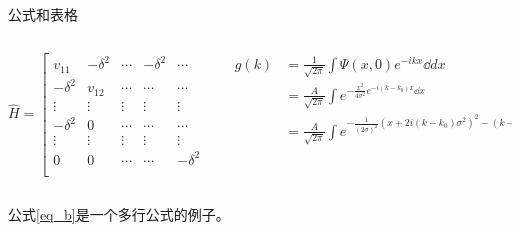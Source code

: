 \documentclass[10pt,aspectratio=169]{beamer}
\begin{document}
\begin{frame}{公式和表格}
    \begin{columns}
        \begin{column}{0.45\textwidth}
        \[ \hat{H} = \left[
        \begin{array}{cccccc}
        v_{11} & -\delta^2  & \cdots &-\delta^2  &\cdots & 0\\
        -\delta^2  & v_{12} & \cdots& \cdots & \cdots & 0\\
        \vdots & \vdots & \vdots & \vdots& \vdots& \vdots \\
        -\delta^2 &0& \cdots &\cdots & \cdots& 0\\
        \vdots &\vdots &\vdots & \vdots &  \vdots & \vdots \\
        0 & 0 & \cdots & \cdots & -\delta^2  &v_{LK}\\
        \end{array} \right] \]
        \end{column}
        \begin{column}{0.55\textwidth}
            \begin{equation}
                \begin{aligned}
                    g(k)&=\frac{1}{\sqrt{2\pi}}\int \Psi(x,0)e^{-ikx}\dd{dx}\\
                    &=\frac{A}{\sqrt{2\pi}}\int e^{-\frac{x^2}{4\sigma^2}e^{-i(k-k_0)x}\dd{x}}\\
                    &=\frac{A}{\sqrt{2\pi}}\int e^{-\frac{1}{(2\sigma)^2}(x+2i(k-k_0)\sigma^2)^2-(k-k_0)^2\sigma^2}\dd{x}
                \end{aligned}
                \label{eq_b}
            \end{equation}
        \end{column}
    \end{columns}
    公式\ref{eq_b}是一个多行公式的例子。
\end{frame}
\end{document}

